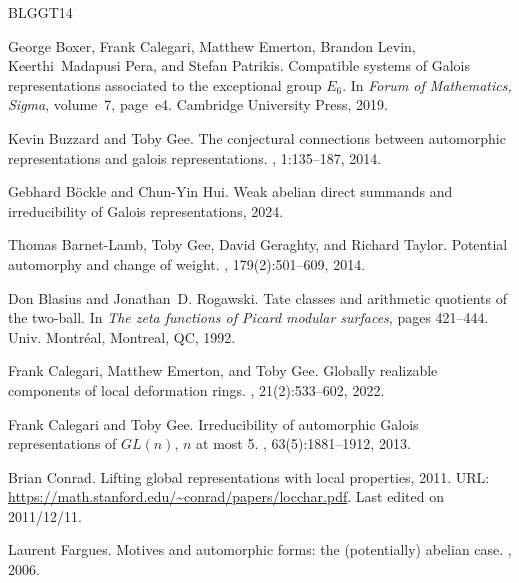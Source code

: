 \documentclass{amsart}
\theoremstyle{definition}
\numberwithin{equation}{section} %
\begin{document}
\newcommand{\etalchar}[1]{$^{#1}$}
\begin{thebibliography}{BLGGT14}

\bibitem[BCE{\etalchar{+}}19]{boxer2019e6}
George Boxer, Frank Calegari, Matthew Emerton, Brandon Levin, Keerthi~Madapusi Pera, and Stefan Patrikis.
\newblock Compatible systems of {G}alois representations associated to the exceptional group ${E}_6$.
\newblock In {\em Forum of Mathematics, Sigma}, volume~7, page~e4. Cambridge University Press, 2019.

Kevin Buzzard and Toby Gee.
\newblock The conjectural connections between automorphic representations and galois representations.
, 1:135--187, 2014.

Gebhard Böckle and Chun-Yin Hui.
\newblock Weak abelian direct summands and irreducibility of {G}alois representations, 2024.

Thomas Barnet-Lamb, Toby Gee, David Geraghty, and Richard Taylor.
\newblock Potential automorphy and change of weight.
, 179(2):501--609, 2014.

Don Blasius and Jonathan~D. Rogawski.
\newblock Tate classes and arithmetic quotients of the two-ball.
\newblock In {\em The zeta functions of {P}icard modular surfaces}, pages 421--444. Univ. Montr\'eal, Montreal, QC, 1992.

Frank Calegari, Matthew Emerton, and Toby Gee.
\newblock Globally realizable components of local deformation rings.
, 21(2):533--602, 2022.

Frank Calegari and Toby Gee.
\newblock Irreducibility of automorphic {G}alois representations of {$GL(n)$}, {$n$} at most 5.
, 63(5):1881--1912, 2013.

Brian Conrad.
\newblock Lifting global representations with local properties, 2011.
\newblock URL: \url{https://math.stanford.edu/~conrad/papers/locchar.pdf}. Last edited on 2011/12/11.

Laurent Fargues.
\newblock Motives and automorphic forms: the (potentially) abelian case.
, 2006.


\end{thebibliography}
\end{document}
